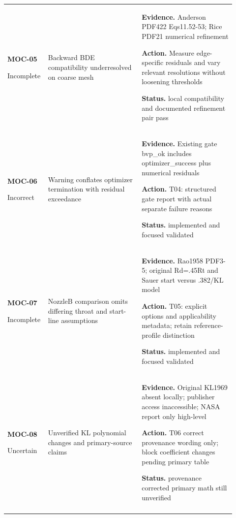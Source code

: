\begin{longtable}{@{}P{0.12\linewidth}P{0.40\linewidth}P{0.40\linewidth}@{}}
\textbf{MOC-05}\par Incomplete & Backward BDE compatibility underresolved on coarse mesh\par {}\par {} & \textbf{Evidence.} Anderson PDF422 Eqs11.52-53; Rice PDF21 numerical refinement\par \textbf{Action.} Measure edge-specific residuals and vary relevant resolutions without loosening thresholds\par \textbf{Status.} local compatibility and documented refinement pair pass\\ \addlinespace[5pt]
\textbf{MOC-06}\par Incorrect & Warning conflates optimizer termination with residual exceedance\par {} & \textbf{Evidence.} Existing gate bvp\_ok includes optimizer\_success plus numerical residuals\par \textbf{Action.} T04: structured gate report with actual separate failure reasons\par \textbf{Status.} implemented and focused validated\\ \addlinespace[5pt]
\textbf{MOC-07}\par Incomplete & NozzleB comparison omits differing throat and start-line assumptions\par {}\par {} & \textbf{Evidence.} Rao1958 PDF3-5; original Rd=.45Rt and Sauer start versus .382/KL model\par \textbf{Action.} T05: explicit options and applicability metadata; retain reference-profile distinction\par \textbf{Status.} implemented and focused validated\\ \addlinespace[5pt]
\textbf{MOC-08}\par Uncertain & Unverified KL polynomial changes and primary-source claims\par {} & \textbf{Evidence.} Original KL1969 absent locally; publisher access inaccessible; NASA report only high-level\par \textbf{Action.} T06 correct provenance wording only; block coefficient changes pending primary table\par \textbf{Status.} provenance corrected primary math still unverified\\ \addlinespace[5pt]

\end{longtable}

